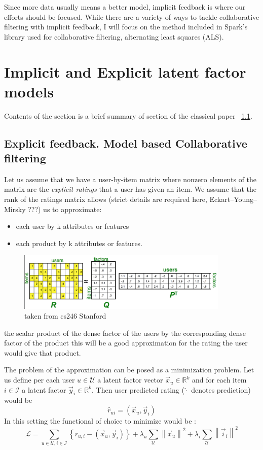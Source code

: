 \documentclass[12pt]{article}
\newcommand{\norm}[1]{\left\lVert#1\right\rVert}
\begin{document}
Since more data usually means a better model, implicit feedback is where our efforts should be focused. While there are a variety of ways to tackle collaborative filtering with implicit feedback, I will focus on the method included in Spark’s library used for collaborative filtering, alternating least squares (ALS).

\section{Implicit and Explicit latent factor models}\label{overview}
Contents of the section is a brief summary of section of the classical paper  ~\ref{}.
\subsection{Explicit feedback. Model based Collaborative filtering}
Let us assume that we have a user-by-item matrix where nonzero elements of the matrix are the {\it{explicit ratings}} that a user has given an item. We assume that the rank of the ratings matrix allows (strict details are required here, Eckart–Young–Mirsky ???) us to approximate: 
\begin{itemize}
\item each user by k attributes or features
\item each product by k attributes or features. 
\end{itemize}
\begin{figure}[h]
\caption{taken from cs246 Stanford}
\includegraphics[width=0.9\textwidth]{cs246_model_m_factor}
\end{figure}
the scalar product of the dense factor of the users by the corresponding dense factor of the product  this will be a good approximation for the rating the user would give that product.

The problem of the approximation can be posed as a minimization problem. Let us define per each user $u \in \mathcal{U}$ a latent factor vector $\vec{x}_u \in \mathbb{R}^k$ and for each item  $i \in \mathcal{I}$ a latent factor $\vec{y}_i \in \mathbb{R}^k$. Then user predicted rating ($\hat{\cdot}$ denotes prediction) would be 
\begin{equation}
\hat{r}_{ui} = (\vec{x}_u, \vec{y}_i)
\end{equation}
In this setting the functional of choice to minimize would be :
\begin{equation}
\mathcal{L} = \sum_{u \in \mathcal{U}, i \in \mathcal{I}} 
\left\{r_{u,i}-(\vec{x}_u, \vec{y}_i)\right\} 
+ 
\lambda_u \sum_{\mathcal{U}}\norm{\vec{x}_u}^2
+ 
\lambda_i \sum_{\mathcal{U}}\norm{\vec{i}_i}^2
\end{equation}
\end{document}
